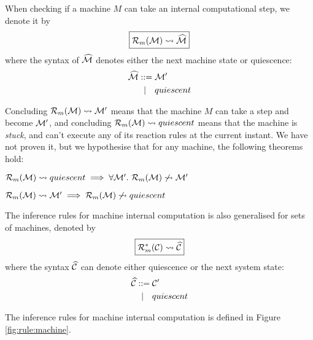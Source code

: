 \clearpage

When checking if a machine $M$ can take an internal computational step, we
denote it by
\begin{equation*}
\boxed{\mathcal{R}_m(\mathcal{M}) \leadsto \widehat{\mathcal{M}}}
\end{equation*}
where the syntax of $\widehat{\mathcal{M}}$ denotes either the next machine state or quiescence:
\begin{align*}
 \widehat{\mathcal{M}} ::={}& \mathcal{M}' \\
   |\quad{}& quiescent
\end{align*}

Concluding $\mathcal{R}_m(\mathcal{M}) \leadsto \mathcal{M}'$ means that the machine $M$ can take a step
and become $\mathcal{M}'$, and concluding $\mathcal{R}_m(\mathcal{M}) \leadsto quiescent$ means that the
machine is \emph{stuck}, and can't execute any of its reaction rules at the
current instant. We have not proven it, but we hypothesise that for any
machine, the following theorems hold:
\begin{theorem}
$\mathcal{R}_m(\mathcal{M}) \leadsto quiescent \implies \forall \mathcal{M}'.~ \mathcal{R}_m(\mathcal{M}) \not\leadsto \mathcal{M}'$
\end{theorem}
\begin{theorem}
$\mathcal{R}_m(\mathcal{M}) \leadsto \mathcal{M}' \implies \mathcal{R}_m(\mathcal{M}) \not\leadsto quiescent$
\end{theorem}

The inference rules for machine internal computation is also generalised for
sets of machines, denoted by
\begin{equation*}
 \boxed{\mathcal{R}_m^*(\mathcal{C}) \leadsto \widehat{\mathcal{C}}}
\end{equation*}
where the syntax $\widehat{\mathcal{C}}$ can denote either quiescence or the next system
state:
\begin{align*}
 \widehat{\mathcal{C}} ::={}& \mathcal{C}' \\
    |\quad{}& quiescent
\end{align*}

The inference rules for machine internal computation is defined in
Figure \ref{fig:rule:machine}.

